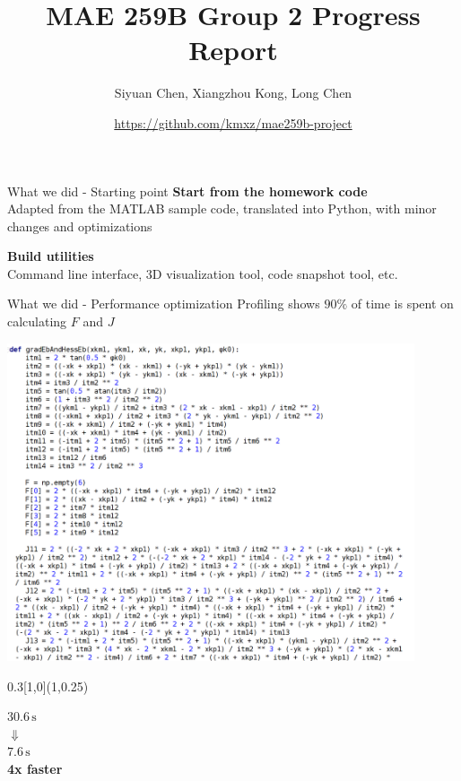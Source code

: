 \documentclass{beamer}
\title{MAE 259B Group 2 Progress Report}
\date{\url{https://github.com/kmxz/mae259b-project}}
\author{Siyuan Chen, Xiangzhou Kong, Long Chen}
\begin{document}
    \maketitle
    \begin{frame}{What we did - Starting point}
        \textbf{Start from the homework code}\\
	    Adapted from the MATLAB sample code, translated into Python, with minor changes and optimizations
        
        \textbf{Build utilities}\\
        Command line interface, 3D visualization tool, code snapshot tool, etc.
        
        \begin{center}
        	 \hspace{2cm}
        \end{center}
    \end{frame}
    \begin{frame}{What we did - Performance optimization}
    	Profiling shows $90\%$ of time is spent on calculating $F$ and $J$
    	
    	\includegraphics[width=0.9\textwidth]{res/getFb.png}
    	\begin{textblock}{0.3}[1,0](1,0.25)
		    \begin{center}
		    	\Large $30.6\,\mathrm s$\\$\Downarrow$\\$7.6\,\mathrm s$\\\bf 4x faster
		    \end{center}
    	\end{textblock}
	\end{frame}
\end{document}
